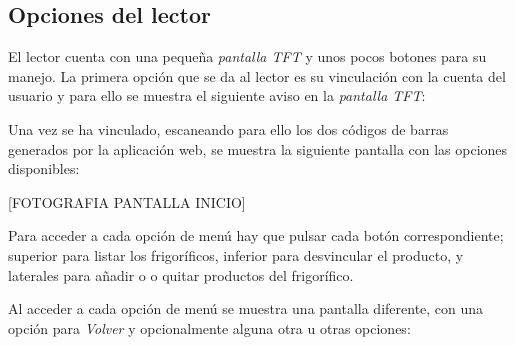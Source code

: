 \subsection{Opciones del lector}

El lector cuenta con una pequeña \emph{pantalla TFT} y unos pocos botones para su manejo. La primera opción que se da al lector es su vinculación con la cuenta del usuario y para ello se muestra el siguiente aviso en la \emph{pantalla TFT}:

Una vez se ha vinculado, escaneando para ello los dos códigos de barras generados por la aplicación web, se muestra la siguiente pantalla con las opciones disponibles:

[FOTOGRAFIA PANTALLA INICIO]

Para acceder a cada opción de menú hay que pulsar cada botón correspondiente; superior para listar los frigoríficos, inferior para desvincular el producto, y laterales para añadir o o quitar productos del frigorífico.

Al acceder a cada opción de menú se muestra una pantalla diferente, con una opción para \emph{Volver} y opcionalmente alguna otra u otras opciones:

